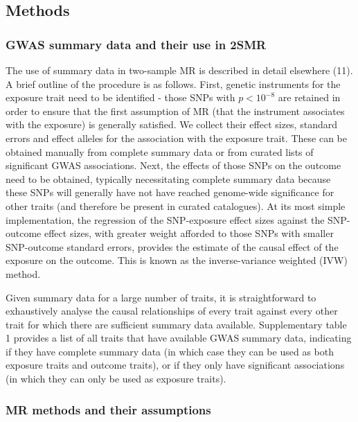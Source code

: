 \documentclass[]{article}
\begin{document}
\subsection{Methods}\label{methods}

\subsubsection{GWAS summary data and their use in
2SMR}\label{gwas-summary-data-and-their-use-in-2smr}

The use of summary data in two-sample MR is described in detail
elsewhere (11). A brief outline of the procedure is as follows. First,
genetic instruments for the exposure trait need to be identified - those
SNPs with \(p < 10^{-8}\) are retained in order to ensure that the first
assumption of MR (that the instrument associates with the exposure) is
generally satisfied. We collect their effect sizes, standard errors and
effect alleles for the association with the exposure trait. These can be
obtained manually from complete summary data or from curated lists of
significant GWAS associations. Next, the effects of those SNPs on the
outcome need to be obtained, typically necessitating complete summary
data because these SNPs will generally have not have reached genome-wide
significance for other traits (and therefore be present in curated
catalogues). At its most simple implementation, the regression of the
SNP-exposure effect sizes against the SNP-outcome effect sizes, with
greater weight afforded to those SNPs with smaller SNP-outcome standard
errors, provides the estimate of the causal effect of the exposure on
the outcome. This is known as the inverse-variance weighted (IVW)
method.

Given summary data for a large number of traits, it is straightforward
to exhaustively analyse the causal relationships of every trait against
every other trait for which there are sufficient summary data available.
Supplementary table 1 provides a list of all traits that have available
GWAS summary data, indicating if they have complete summary data (in
which case they can be used as both exposure traits and outcome traits),
or if they only have significant associations (in which they can only be
used as exposure traits).

\subsubsection{MR methods and their
assumptions}\label{mr-methods-and-their-assumptions}
\end{document}
